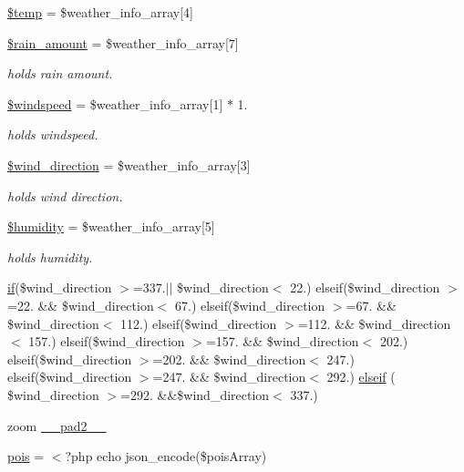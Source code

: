 \begin{DoxyCompactItemize}
\mbox{\hyperlink{rotterdam_2index_8php_a0d57fb0317e19ec798aa625381ebf342}{\$temp}} = \$weather\+\_\+info\+\_\+array\mbox{[}4\mbox{]}
\item 
\mbox{\hyperlink{rotterdam_2index_8php_a2aa7fd45b683a3c60b6f5e5d11a027b3}{\$rain\+\_\+amount}} = \$weather\+\_\+info\+\_\+array\mbox{[}7\mbox{]}
\begin{DoxyCompactList}\small\item\em holds rain amount. \end{DoxyCompactList}\item 
\mbox{\hyperlink{rotterdam_2index_8php_a98bffc039f434ba80b316614e0fc94db}{\$windspeed}} = \$weather\+\_\+info\+\_\+array\mbox{[}1\mbox{]} $\ast$ 1.
\begin{DoxyCompactList}\small\item\em holds windspeed. \end{DoxyCompactList}\item 
\mbox{\hyperlink{rotterdam_2index_8php_acae9d7e1905e3a01e07d87856885aa2c}{\$wind\+\_\+direction}} = \$weather\+\_\+info\+\_\+array\mbox{[}3\mbox{]}
\begin{DoxyCompactList}\small\item\em holds wind direction. \end{DoxyCompactList}\item 
\mbox{\hyperlink{rotterdam_2index_8php_aff5636a5f8216e0c22399f0c2d78a80d}{\$humidity}} = \$weather\+\_\+info\+\_\+array\mbox{[}5\mbox{]}
\begin{DoxyCompactList}\small\item\em holds humidity. \end{DoxyCompactList}\item 
\mbox{\hyperlink{hull_2index_8php_a8f0d8893361d6307986497540738a8bf}{if}}(\$wind\+\_\+direction $>$=337.$\vert$$\vert$ \$wind\+\_\+direction$<$ 22.) elseif(\$wind\+\_\+direction $>$=22. \&\& \$wind\+\_\+direction$<$ 67.) elseif(\$wind\+\_\+direction $>$=67. \&\& \$wind\+\_\+direction$<$ 112.) elseif(\$wind\+\_\+direction $>$=112. \&\& \$wind\+\_\+direction$<$ 157.) elseif(\$wind\+\_\+direction $>$=157. \&\& \$wind\+\_\+direction$<$ 202.) elseif(\$wind\+\_\+direction $>$=202. \&\& \$wind\+\_\+direction$<$ 247.) elseif(\$wind\+\_\+direction $>$=247. \&\& \$wind\+\_\+direction$<$ 292.) \mbox{\hyperlink{rotterdam_2index_8php_aa8f062d2792cb6f2003b5743776f492a}{elseif}} ( \$wind\+\_\+direction $>$=292. \&\&\$wind\+\_\+direction$<$ 337.)
\item 
zoom \mbox{\hyperlink{rotterdam_2index_8php_ac05a3bcb1c5d5d278658456630cbb6e7}{\+\_\+\+\_\+pad2\+\_\+\+\_\+}}
\item 
\mbox{\hyperlink{rotterdam_2index_8php_a6a514fba2a6c59dcbdb65a73e7c76f73}{pois}} = $<$?php echo json\+\_\+encode(\$pois\+Array)
\end{DoxyCompactItemize}


